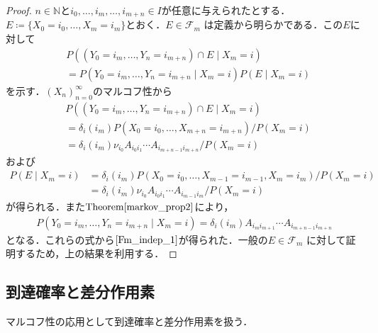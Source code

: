 \documentclass[dvipdfmx,autodetect-engine]{jsarticle}
\theoremstyle{remark}
\theoremstyle{definition}
\newcommand{\N}{\mathbb{N}}
\begin{document}
\begin{proof}
    $n \in \N$と$i_0,\ldots,i_m,\ldots,i_{m+n} \in I$が任意に与えられたとする．
    $E \coloneqq \{X_0 = i_0,\ldots, X_m = i_m\}$とおく．$E \in \mathcal{F}_m$
    は定義から明らかである．この$E$に対して
    \begin{align}
        &P((Y_0=i_m,\ldots,Y_n = i_{m+n})\cap E \mid X_m = i ) \\
        &= 
        P(Y_0=i_m,\ldots,Y_n = i_{m+n} \mid X_m = i) P(E \mid X_m = i) \label{Fm_indep_1}
    \end{align}
    を示す．$(X_n)_{n=0}^{\infty}$のマルコフ性から
    \begin{align}
       &P((Y_0=i_m,\ldots,Y_n = i_{m+n})\cap E \mid X_m = i )\\
        &=\delta_i(i_m) P(X_{0} = i_{0},\ldots,X_{m+n}=i_{m+n}) / P(X_m = i)\\
        &=\delta_i(i_m) \nu_{i_0} A_{i_0 i_1}  \cdots A_{i_{m+n-1} i_{m+n}} / P(X_m = i)
    \end{align}
    および
    \begin{align}
        P(E \mid X_m = i) &= 
        \delta_i(i_m) P(X_0=i_0,\ldots,X_{m-1}=i_{m-1},X_m = i_m) / P(X_m = i)\\
        &= \delta_i(i_m) \nu_{i_0} A_{i_0 i_1} \cdots A_{i_{m-1} i_m} / P(X_m = i)
    \end{align}
    が得られる．また$\mathrm{Theorem}\ref{markov_prop2}$により，
    \begin{align}
        P(Y_0=i_m,\ldots,Y_n = i_{m+n} \mid X_m = i) = 
        \delta_{i}(i_m) A_{i_m i_{m+1}} \cdots A_{i_{m+n-1} i_{m+n}}
    \end{align}
    となる．これらの式から$\eqref{Fm_indep_1}$が得られた．一般の$E \in \mathcal{F}_m$
    に対して証明するため，上の結果を利用する．
\end{proof}
\subsection{到達確率と差分作用素}
マルコフ性の応用として到達確率と差分作用素を扱う．
\end{document}
